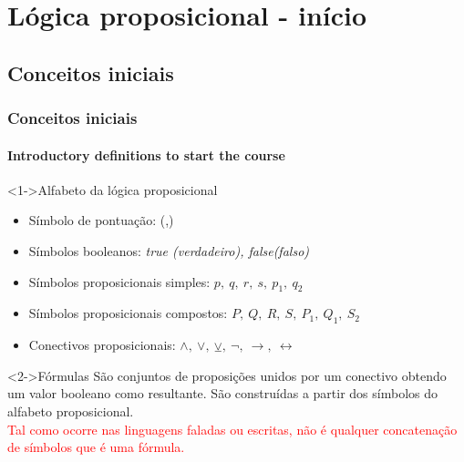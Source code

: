 
\section{Lógica proposicional - início}
%
\subsection{Conceitos iniciais}
%
\begin{frame}[t]
    \frametitle{Conceitos iniciais}
    \framesubtitle{Introductory definitions to start the course}
    \begin{block}<1->{Alfabeto da lógica proposicional}
        \begin{itemize}
            \item Símbolo de pontuação: (,)
            \item Símbolos booleanos: \textit{true (verdadeiro), false(falso)}
            \item Símbolos proposicionais simples: $p,~q,~r,~s,~p_1,~q_2$
            \item Símbolos proposicionais compostos: $P,~Q,~R,~S,~P_1,~Q_1,~S_2$
            \item Conectivos proposicionais: $\land,~\lor,~\veebar,~\lnot,~\rightarrow, ~\leftrightarrow$
        \end{itemize}
    \end{block}
    \begin{block}<2->{Fórmulas}
        \quad São conjuntos de proposições unidos por um conectivo obtendo um valor booleano como resultante. São construídas a partir dos símbolos do alfabeto proposicional.\\
        \quad \textcolor{red}{Tal como ocorre nas linguagens faladas ou escritas, não é qualquer concatenação de símbolos que é uma fórmula.}
    \end{block}
\end{frame}
%
